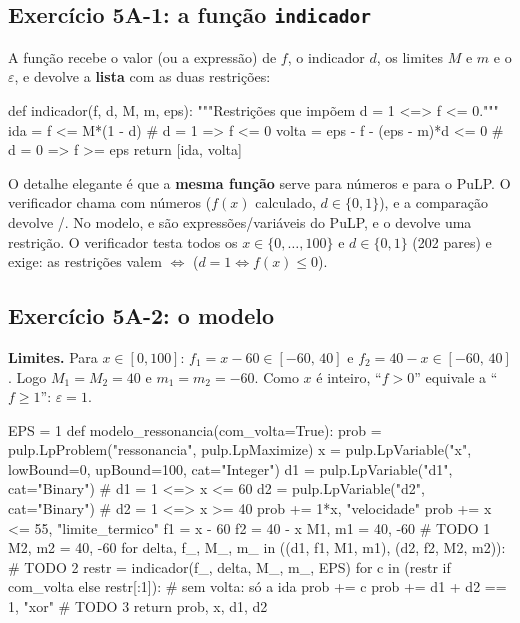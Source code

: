 \subsection*{Exercício 5A-1: a função \texttt{indicador}}

A função recebe o valor (ou a expressão) de $f$, o indicador $d$, os limites $M$ e $m$ e o $\varepsilon$, e devolve a
\textbf{lista} com as duas restrições:
\begin{codigo}
def indicador(f, d, M, m, eps):
    """Restrições que impõem  d = 1  <=>  f <= 0."""
    ida   = f <= M*(1 - d)                 # d = 1  =>  f <= 0
    volta = eps - f - (eps - m)*d <= 0     # d = 0  =>  f >= eps
    return [ida, volta]
\end{codigo}
O detalhe elegante é que a \textbf{mesma função} serve para números e para o PuLP. O verificador chama
 com números ($f(x)$ calculado, $d\in\{0,1\}$), e a comparação \py{<=} devolve /.
No modelo,  e  são expressões/variáveis do PuLP, e o \py{<=} devolve uma restrição. O verificador testa
todos os $x\in\{0,\dots,100\}$ e $d\in\{0,1\}$ (202 pares) e exige: as restrições valem $\iff$ ($d=1\iff f(x)\le0$).

\subsection*{Exercício 5A-2: o modelo}

\textbf{Limites.} Para $x\in[0,100]$: $f_1=x-60\in[-60,\,40]$ e $f_2=40-x\in[-60,\,40]$. Logo
$M_1=M_2=40$ e $m_1=m_2=-60$. Como $x$ é inteiro, ``$f>0$'' equivale a ``$f\ge1$'': $\varepsilon=1$.

\begin{codigo}
EPS = 1
def modelo_ressonancia(com_volta=True):
    prob = pulp.LpProblem("ressonancia", pulp.LpMaximize)
    x  = pulp.LpVariable("x", lowBound=0, upBound=100, cat="Integer")
    d1 = pulp.LpVariable("d1", cat="Binary")      # d1 = 1 <=> x <= 60
    d2 = pulp.LpVariable("d2", cat="Binary")      # d2 = 1 <=> x >= 40
    prob += 1*x, "velocidade"
    prob += x <= 55, "limite_termico"
    f1 = x - 60
    f2 = 40 - x
    M1, m1 = 40, -60                              # TODO 1
    M2, m2 = 40, -60
    for delta, f_, M_, m_ in ((d1, f1, M1, m1), (d2, f2, M2, m2)):   # TODO 2
        restr = indicador(f_, delta, M_, m_, EPS)
        for c in (restr if com_volta else restr[:1]):   # sem volta: só a ida
            prob += c
    prob += d1 + d2 == 1, "xor"                   # TODO 3
    return prob, x, d1, d2
\end{codigo}

